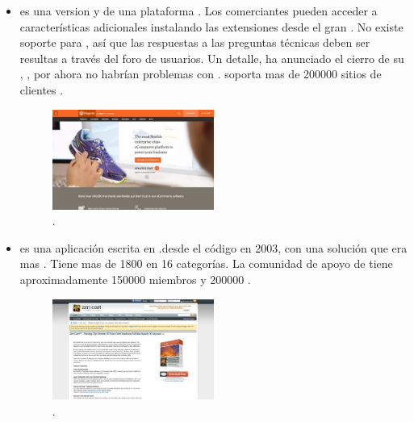 \begin{itemize}
	\item \textbf{\nameMagento \Community \Edition} es una version \free y \openSourcePC de  una plataforma \ecommerce. Los comerciantes pueden acceder a características adicionales instalando las extensiones desde el gran \nameMagento \connectCustom \marketplace. No existe soporte para \nameMagento \Community \Edition, así que las respuestas a las preguntas técnicas deben ser resultas a través del foro de usuarios. Un detalle, \nameMagento ha anunciado el cierro de su \hosted \solution, \nameMagento \go, por ahora no habrían problemas con \Community \Edition. \nameMagento \Community \Edition soporta mas de 200000 sitios de clientes .

	\begin{figure}[H]
		\centering
		\includegraphics[width=0.5\textwidth]{figuras/cap1/MagentoWebsite.jpg}
		\caption{\nameMagento \websiteINT \cite{online_Magento}.}
	\end{figure}


	\item \textbf{\nameZenCart} es una aplicación \ecommerce \openSourcePC escrita en \phpNAME.\nameZenCart \branched desde el código \nameOsCommerce en 2003, con una solución que era mas \templateBased. Tiene mas de 1800 \addOns en 16 categorías. La comunidad de apoyo de \nameZenCart tiene aproximadamente 150000 miembros y 200000 \threadsPL.

	\begin{figure}[H]
		\centering
		\includegraphics[width=0.5\textwidth]{figuras/cap1/ZenCartWebsite.jpg}
		\caption{\nameZenCart \websiteINT \cite{online_ZenCart}.}
	\end{figure}



\end{itemize}
